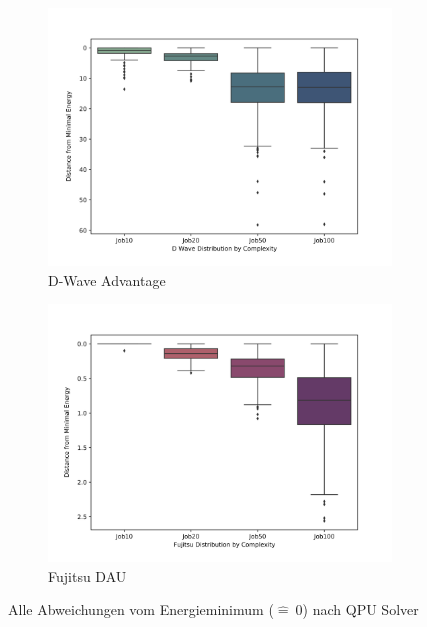 \begin{figure}[H]
        \centering
        \begin{subfigure}[b]{0.495\textwidth}
            \centering
            \includegraphics[trim={0 0.7cm 0 1.7cm}, clip,width=\textwidth]{images/D Wave Deviation.png}
            \caption[]%
            {{\small D-Wave Advantage }}    
            \label{fig:DeviationDWave}
        \end{subfigure}
        \hfill
        \begin{subfigure}[b]{0.495\textwidth}  
            \centering 
            \includegraphics[trim={0 0.7cm 0 1.7cm}, clip,width=\textwidth]{images/Fujitsu Deviation.png}
            \caption[]%
            {{\small Fujitsu DAU}}    
            \label{fig:DeviationFujitsu}
        \end{subfigure}
        \caption[ Ergebnisse nach Komplexität ]
         {\small Alle  Abweichungen vom Energieminimum ($\widehat{=}~0$) nach QPU Solver} 
        \label{fig:Deviation}
    \end{figure}

